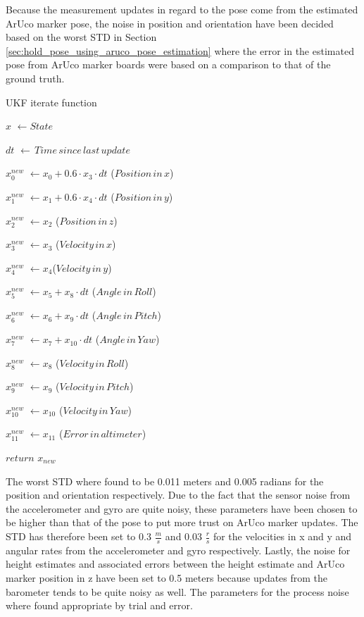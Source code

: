 \documentclass[../Head/report.tex]{subfiles}
\begin{document}
Because the measurement updates in regard to the pose come from the estimated ArUco marker pose, the noise in position and orientation have been decided based on the worst STD in Section \ref{sec:hold_pose_using_aruco_pose_estimation} where the error in the estimated pose from ArUco marker boards were based on a comparison to that of the ground truth. 

\begin{Pseudo}{UKF iterate function}{}
\begin{Indentation}
	\item $x$ \( \leftarrow State \)
	\item $dt$ \( \leftarrow\, Time\, since\, last\, update \)
	\item $x^{new}_0$ \(\leftarrow x_0 + 0.6 \cdot x_3 \cdot dt\) \qquad ($Position\, in\, x$)
	\item $x^{new}_1$ \(\leftarrow x_1 + 0.6 \cdot x_4 \cdot dt\) \qquad ($Position\, in\, y$)
	\item $x^{new}_2$ \(\leftarrow x_2\) \qquad ($Position\, in\, z$)
	\item $x^{new}_3$ \(\leftarrow x_3\) \qquad ($Velocity\, in\, x$)
	\item $x^{new}_4$ \(\leftarrow x_4\)\qquad ($Velocity\, in\, y$)
	\item $x^{new}_5$ \(\leftarrow x_5 + x_8 \cdot dt\) \qquad ($Angle\, in\, Roll$)
	\item $x^{new}_6$ \(\leftarrow x_6 + x_{9} \cdot dt\) \qquad ($Angle\, in\, Pitch$)
	\item $x^{new}_7$ \(\leftarrow x_7 + x_{10} \cdot dt\) \qquad ($Angle\, in\, Yaw$)
	\item $x^{new}_8$ \(\leftarrow x_8 \) \qquad ($Velocity\, in\, Roll$)
	\item $x^{new}_9$ \(\leftarrow x_9 \) \qquad ($Velocity\, in\, Pitch$)
	\item $x^{new}_{10}$ \(\leftarrow x_{10} \) \qquad ($Velocity\, in\, Yaw$)
	\item $x^{new}_{11}$ \(\leftarrow x_{11} \) \qquad ($Error\, in\, altimeter$)
	\item $return$ $x_{new}$	
\end{Indentation}
\label{pse:ukf_iterate_function}
\end{Pseudo}

The worst STD where found to be 0.011 meters and 0.005 radians for the position and orientation respectively. Due to the fact that the sensor noise from the accelerometer and gyro are quite noisy, these parameters have been chosen to be higher than that of the pose to put more trust on ArUco marker updates. The STD has therefore been set to 0.3 $\frac{m}{s}$ and 0.03 $\frac{r}{s}$ for the velocities in x and y and angular rates from the accelerometer and gyro respectively. Lastly, the noise for height estimates and associated errors between the height estimate and ArUco marker position in z have been set to 0.5 meters because updates from the barometer tends to be quite noisy as well. The parameters for the process noise where found appropriate by trial and error.
\end{document}
